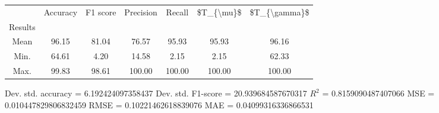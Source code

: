 \begin{tabular}{|c|c|c|c|c|c|c|}
\toprule
{} &  Accuracy &  F1 score &  Precision &  Recall &  \$T\_\{\textbackslash mu\}\$ &  \$T\_\{\textbackslash gamma\}\$ \\
Results &           &           &            &         &            &               \\
\hline
Mean    &     96.15 &     81.04 &      76.57 &   95.93 &      95.93 &         96.16 \\
Min.    &     64.61 &      4.20 &      14.58 &    2.15 &       2.15 &         62.33 \\
Max.    &     99.83 &     98.61 &     100.00 &  100.00 &     100.00 &        100.00 \\
\bottomrule
\end{tabular}

 Dev. std. accuracy = 6.192424097358437
 Dev. std. F1-score = 20.939684587670317
 $R^2$ = 0.8159090487407066
 MSE = 0.010447829806832459
 RMSE = 0.10221462618839076
 MAE = 0.04099316336866531